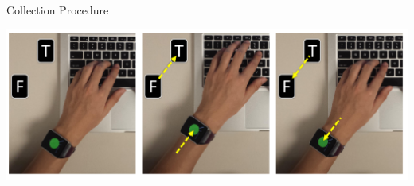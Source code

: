 \documentclass[ucs,9pt]{beamer}
\begin{document}
\begin{frame}{Collection Procedure}
	
\begin{minipage}[c]{0.49\linewidth}
\includegraphics[width=\textwidth]{imgs/watchMovement}


\end{minipage}
\end{frame}
\end{document}
